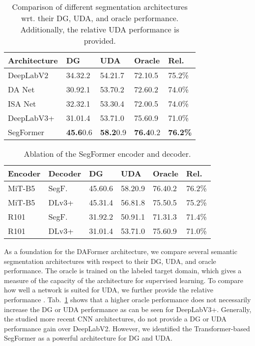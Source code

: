 \documentclass[journal,compsoc]{IEEEtran}
\newcommand{\spm}[1]{\tiny{#1}}
\begin{document}
\begin{table}
\centering
\caption{
Comparison of different segmentation architectures wrt. their DG, UDA, and oracle performance.
Additionally, the relative UDA performance  is provided. 
}
\label{tab:basic_architecture_comparison}
\footnotesize
\begin{tabular}{lllll}
\toprule
    Architecture &       DG &           UDA &         Oracle &   Rel. \\
\midrule
    DeepLabV2~\cite{chen2017deeplab} & 34.3\spm{2.2} & 54.2\spm{1.7} & 72.1\spm{0.5} & 75.2\% \\
        DA Net~\cite{fu2019dual} & 30.9\spm{2.1} & 53.7\spm{0.2} & 72.6\spm{0.2} & 74.0\% \\
        ISA Net~\cite{huang2019interlaced} & 32.3\spm{2.1} & 53.3\spm{0.4} & 72.0\spm{0.5} & 74.0\% \\
    DeepLabV3+~\cite{chen2018encoder} & 31.0\spm{1.4} & 53.7\spm{1.0} & 75.6\spm{0.9} & 71.0\% \\
    SegFormer~\cite{xie2021segformer} & \textbf{45.6}\spm{0.6} & \textbf{58.2}\spm{0.9} & \textbf{76.4}\spm{0.2} & \textbf{76.2\%} \\
\bottomrule
\end{tabular}
\end{table} 
\begin{table}
\centering
\caption{Ablation of the SegFormer encoder and decoder.}
\label{tab:encoder_decoder}
\footnotesize
\setlength{\tabcolsep}{5pt}
\begin{tabular}{llllll}
\toprule
    Encoder &             Decoder &           DG & UDA &         Oracle &   Rel. \\
\midrule
    MiT-B5~\cite{xie2021segformer} &           SegF.~\cite{xie2021segformer} & 45.6\spm{0.6} & 58.2\spm{0.9} & 76.4\spm{0.2} & 76.2\% \\
    MiT-B5~\cite{xie2021segformer} &           DLv3+~\cite{chen2018encoder} & 45.3\spm{1.4} & 56.8\spm{1.8} & 75.5\spm{0.5} & 75.2\% \\
    R101~\cite{he2016deep} &           SegF.~\cite{xie2021segformer} & 31.9\spm{2.2} & 50.9\spm{1.1} & 71.3\spm{1.3} & 71.4\% \\
    R101~\cite{he2016deep} &           DLv3+~\cite{chen2018encoder} & 31.0\spm{1.4} & 53.7\spm{1.0} & 75.6\spm{0.9} & 71.0\% \\
\bottomrule
\end{tabular}
\end{table} 
As a foundation for the DAFormer architecture, we compare several semantic segmentation architectures with respect to their DG, UDA, and oracle performance.
The oracle is trained on the labeled target domain, which gives a measure of the capacity of the architecture for supervised learning. 
To compare how well a network is suited for UDA, we further provide the relative performance . 
Tab.~\ref{tab:basic_architecture_comparison} shows that a higher oracle performance does not necessarily increase the DG or UDA performance as can be seen for DeepLabV3+. Generally, the studied more recent CNN architectures, do not provide a DG or UDA performance gain over DeepLabV2. However, we identified the Transformer-based SegFormer as a powerful architecture for DG and UDA.
\end{document}
